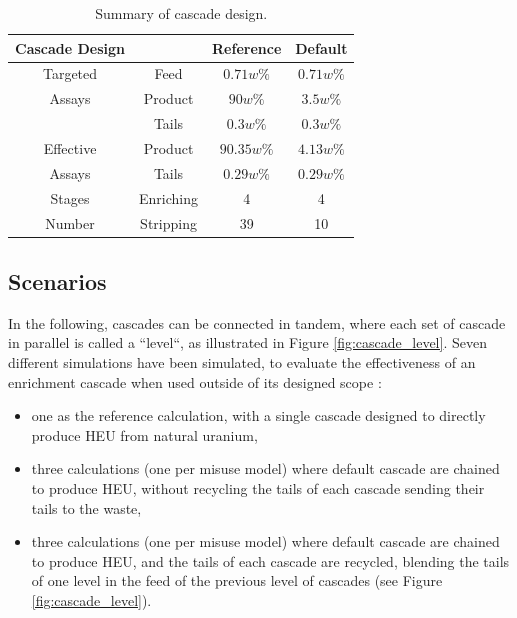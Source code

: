 \begin{table}[htb]
\centering
  \caption{Summary of cascade design.}
\begin{tabular}{cccc}
\toprule

Cascade Design &       & Reference   & Default    \\
\midrule
Targeted  & Feed       & $0.71w\%$   & $0.71w\%$  \\
Assays    & Product    & $90w\%$     & $3.5w\%$   \\
          & Tails      & $0.3w\%$   & $0.3w\%$   \\
\midrule
Effective & Product    & $90.35w\%$  & $4.13w\%$  \\
Assays    & Tails      & $0.29w\%$   & $0.29w\%$  \\ 
\midrule
Stages    & Enriching  & 4          & 4          \\
Number    & Stripping  & 39         & 10         \\
\bottomrule
\end{tabular}
  \label{tab:cascade_config}
\end{table}


\subsection{Scenarios}
In the following, cascades can be connected in tandem, where each set of cascade
in parallel is called a ``level``, as illustrated in Figure
\ref{fig:cascade_level}.
Seven different simulations have been simulated, to evaluate the effectiveness
of an enrichment cascade when used outside of its designed scope :
\begin{itemize}
\item one as the reference calculation, with a single cascade designed to
    directly produce \gls{HEU} from natural uranium,
\item three calculations (one per misuse model) where default cascade are
    chained to produce \gls{HEU}, without recycling the tails of each cascade
    sending their tails to the waste,
\item three calculations (one per misuse model) where default cascade are
    chained to produce \gls{HEU}, and the tails of each cascade are recycled, blending
    the tails of one level in the feed of the previous level of
    cascades (see Figure \ref{fig:cascade_level}).
\end{itemize}

